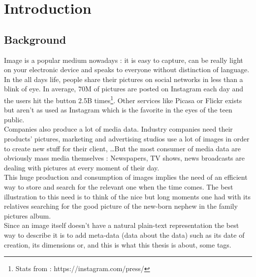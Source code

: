 
\chapter{Introduction} %

\label{Chapter1} %



\section{Background}

Image is a popular medium nowadays : it is easy to capture, can be really light on your electronic device and speaks to everyone without distinction of language.\\

In the all days life, people share their pictures on social networks in less than a blink of eye. In average, 70M of pictures are posted on Instagram each day and the users hit the  button 2.5B times\footnote{Stats from : https://instagram.com/press/}. Other services like Picasa or Flickr exists but aren't as used as Instagram which is the favorite in the eyes of the teen public.\\
Companies also produce a lot of media data. Industry companies need their products' pictures, marketing and advertising studios use a lot of images in order to create new stuff for their client, \dots But the most consumer of media data are obviously mass media themselves : Newspapers, TV shows, news broadcasts are dealing with pictures at every moment of their day.\\

This huge production and consumption of images implies the need of an efficient way to store and search for the relevant one when the time comes. The best illustration to this need is to think of the nice but long moments one had with its relatives searching for the good picture of the new-born nephew in the family pictures album.\\
Since an image itself doesn't have a natural plain-text representation the best way to describe it is to add meta-data (data about the data) such as its date of creation, its dimensions or, and this is what this thesis is about, some tags.\\

